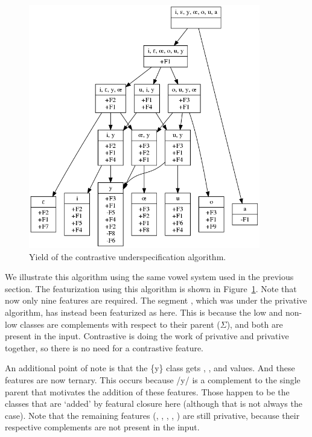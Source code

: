 \documentclass[11pt, oneside]{article}   	%
\begin{document}
\begin{figure}[htb!]
	\centering
	\includegraphics[width=0.9\textwidth]{vowel_inventory_contrastive_under.png}
	\caption{Yield of the contrastive underspecification algorithm.}
	\label{fig:vowel_inventory_contrastive_under}
\end{figure}

We illustrate this algorithm using the same vowel system used in the previous section. The featurization using this algorithm is shown in Figure~\ref{fig:vowel_inventory_contrastive_under}. Note that now only nine features are required. The segment , which was  under the privative algorithm, has instead been featurized as  here. This is because the low and non-low classes are complements with respect to their parent ($\Sigma$), and both are present in the input. Contrastive  is doing the work of privative  and privative  together, so there is no need for a contrastive  feature.

An additional point of note is that the \{y\} class gets , , and  values. And these features are now ternary. This occurs because /y/ is a complement to the single parent that motivates the addition of these features. Those happen to be the classes that are `added' by featural closure here (although that is not always the case). Note that the remaining features (, , , , ) are still privative, because their respective complements are not present in the input.
\end{document}
